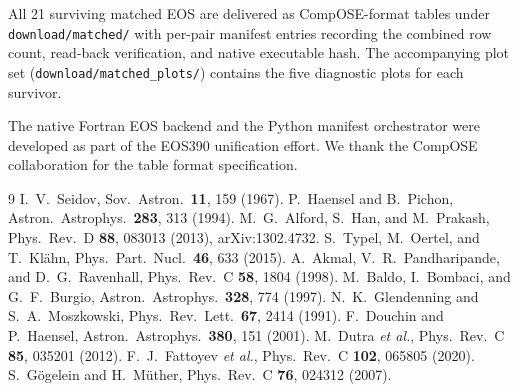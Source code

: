 \documentclass[aps,prc,reprint,notitlepage]{revtex4-2}
\begin{document}
All 21 surviving matched EOS are delivered as CompOSE-format tables under
\texttt{download/matched/} with per-pair manifest entries recording the
combined row count, read-back verification, and native executable hash.
The accompanying plot set (\texttt{download/matched\_plots/}) contains the
five diagnostic plots for each survivor.

\begin{acknowledgments}
The native Fortran EOS backend and the Python manifest orchestrator were
developed as part of the EOS390 unification effort.  We thank the CompOSE
collaboration for the table format specification.
\end{acknowledgments}

\begin{thebibliography}{9}
 I.~V.~Seidov, Sov.\ Astron.\ \textbf{11}, 159 (1967).
 P.~Haensel and B.~Pichon, Astron.\ Astrophys.\ \textbf{283}, 313 (1994).
 M.~G.~Alford, S.~Han, and M.~Prakash, Phys.\ Rev.\ D \textbf{88}, 083013 (2013), arXiv:1302.4732.
 S.~Typel, M.~Oertel, and T.~Kl\"ahn, Phys.\ Part.\ Nucl.\ \textbf{46}, 633 (2015).
 A.~Akmal, V.~R.~Pandharipande, and D.~G.~Ravenhall, Phys.\ Rev.\ C \textbf{58}, 1804 (1998).
 M.~Baldo, I.~Bombaci, and G.~F.~Burgio, Astron.\ Astrophys.\ \textbf{328}, 774 (1997).
 N.~K.~Glendenning and S.~A.~Moszkowski, Phys.\ Rev.\ Lett.\ \textbf{67}, 2414 (1991).
 F.~Douchin and P.~Haensel, Astron.\ Astrophys.\ \textbf{380}, 151 (2001).
 M.~Dutra \emph{et al.}, Phys.\ Rev.\ C \textbf{85}, 035201 (2012).
 F.~J.~Fattoyev \emph{et al.}, Phys.\ Rev.\ C \textbf{102}, 065805 (2020).
 S.~G\"ogelein and H.~M\"uther, Phys.\ Rev.\ C \textbf{76}, 024312 (2007).
\end{thebibliography}
\end{document}
